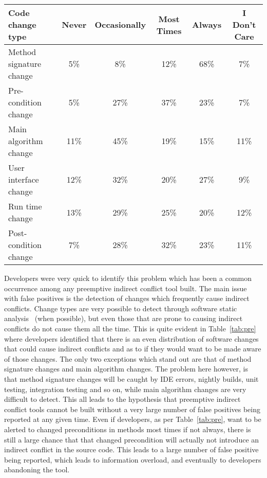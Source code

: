 \documentclass[conference]{IEEEtran}
\begin{document}
\begin{table*}[tb!]
\begin{center}
\begin{tabular}{| p{7cm} | c | c | c | c | c |}
\hline
Code change type &Never  & Occasionally & Most Times & Always & I Don't Care \\
\hline
\hline
Method signature change & 5\% & 8\% & 12\% & 68\% & 7\% \\ \hline
Pre-condition change & 5\% & 27\% & 37\% & 23\% & 7\% \\ \hline
Main algorithm change & 11\% & 45\% & 19\% & 15\% & 11\% \\ \hline
User interface change & 12\% & 32\% & 20\% & 27\% & 9\% \\ \hline
Run time change & 13\% & 29\% & 25\% & 20\% & 12\% \\ \hline
Post-condition change & 7\% & 28\% & 32\% & 23\% & 11\% \\ \hline
\end{tabular}
\end{center}
\caption{Results of survey questions to source code changes that developers deem notification worthy, in terms of percentage
of developers surveyed.\label{tab:pre}}
\end{table*}

Developers were very quick to identify this problem which has
been a common occurrence among any preemptive indirect conflict tool built. The main issue with false positives is the detection of changes
which frequently cause indirect conflicts. Change types are very possible to detect through software static analysis~\cite{Fluri:2007:CDT} (when possible), 
but even those that are
prone to causing indirect conflicts do not cause them all the time. This is quite evident in Table~\ref{tab:pre} where developers identified
that there is an even distribution of software changes that could cause indirect conflicts and as to if they would want to be made aware of
those changes. The only two exceptions which stand out are that of method signature changes and main algorithm changes. The problem here however,
is that method signature changes will be caught by IDE errors, nightly builds, unit testing, integration testing and so on, while main algorithm
changes are very difficult to detect. This all leads to the hypothesis that preemptive indirect conflict tools cannot be built without a very
large number of false positives being reported at any given time. Even if developers, as per Table~\ref{tab:pre}, want to be alerted to 
changed preconditions in methods most times if not always, there is still a large chance that that changed precondition will actually not
introduce an indirect conflict in the source code. This leads to a large number of false positive being reported, which leads to information
overload, and eventually to developers abandoning the tool.
\end{document}
